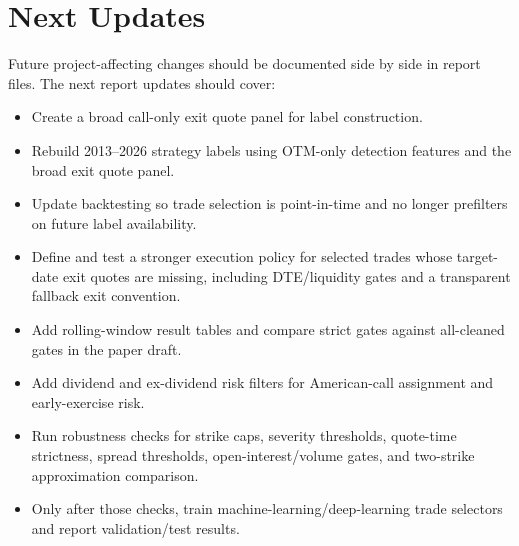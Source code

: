 \documentclass[11pt]{article}
\begin{document}
\section*{Next Updates}

Future project-affecting changes should be documented side by side in report
files. The next report updates should cover:

\begin{itemize}
  \item Create a broad call-only exit quote panel for label construction.
  \item Rebuild 2013--2026 strategy labels using OTM-only detection features
  and the broad exit quote panel.
  \item Update backtesting so trade selection is point-in-time and no longer
  prefilters on future label availability.
  \item Define and test a stronger execution policy for selected trades whose
  target-date exit quotes are missing, including DTE/liquidity gates and a
  transparent fallback exit convention.
  \item Add rolling-window result tables and compare strict gates against
  all-cleaned gates in the paper draft.
  \item Add dividend and ex-dividend risk filters for American-call assignment
  and early-exercise risk.
  \item Run robustness checks for strike caps, severity thresholds, quote-time
  strictness, spread thresholds, open-interest/volume gates, and two-strike
  approximation comparison.
  \item Only after those checks, train machine-learning/deep-learning trade
  selectors and report validation/test results.
\end{itemize}
\end{document}
